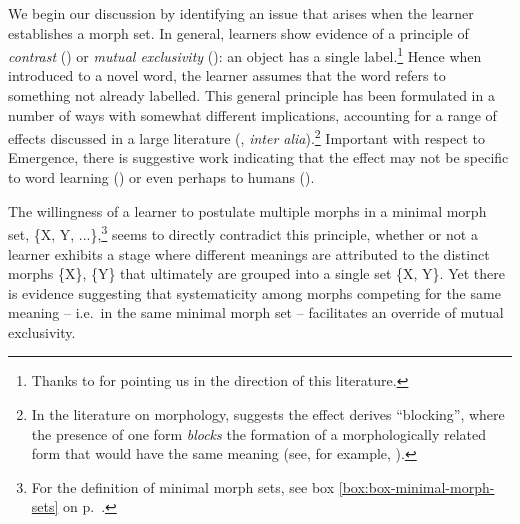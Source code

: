 We begin our discussion by identifying an issue that arises when the learner establishes a morph set. In general, learners show evidence of a principle of {\it contrast} (\citealt{Clark:1987}) or {\it mutual exclusivity} (\citealt{Markman+:1988}): an object has a single label.\footnote{Thanks to
 for pointing us in the direction of this literature.} Hence when introduced to a novel word, the learner assumes that the word refers to something not already labelled. This general principle has been formulated in a number of ways with somewhat different implications, accounting for a range of effects discussed in a large literature (\citealt{Slobin:1973, Wexler+:1980, Pinker:1984, Clark:1987, Markman+:1988, Markman:1989, Markman:1992, Musolino:1999, Markman+:2003}, {\it inter alia}).\footnote{In the literature on morphology, \citet{Clark:1987} suggests the effect  derives ``blocking'', where the presence of one form {\it blocks} the formation of a morphologically related form that would have the same meaning (see, for example, \citealt{Aronoff:1976, Kiparsky:1982lexical-phonology}).} Important with respect to Emergence, there is suggestive work indicating that the effect may not be specific to word learning (\citealt{Markman+:1988, Markman:1989, Markson+:1997, Childers+:2003, Moher+:2010, Orena+:underreview}) or even perhaps to humans (\citealt{Kaminski+:2004, Markman+:2004, Fischer+:2004}).
 



The willingness of a learner to postulate multiple morphs in a minimal morph set, \{X, Y, ...\},\footnote{For the definition of minimal morph sets, see box \ref{box:box-minimal-morph-sets} on p.\ \pageref{box:box-minimal-morph-sets}.} seems to directly contradict this principle, whether or not a learner exhibits a stage where different meanings are attributed to the distinct morphs \{X\},  \{Y\} that ultimately are grouped into a single set \{X, Y\}.   Yet there is evidence suggesting that  systematicity among morphs competing for the same meaning -- i.e.\ in the same minimal morph set -- facilitates an override of mutual exclusivity.

